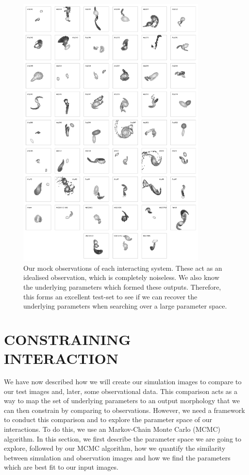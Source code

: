 \begin{figure}
    \centering
    \includegraphics[width=0.85\textwidth]{Chapter1/figures/mock-images.pdf}
    \caption{Our mock observations of each interacting system. These act as an idealised observation, which is completely noiseless. We also know the underlying parameters which formed these outputs. Therefore, this forms an excellent test-set to see if we can recover the underlying parameters when searching over a large parameter space.}
    \label{fig:Obj_Cutout}
\end{figure}

\section{CONSTRAINING INTERACTION}\label{method:constraint}
We have now described how we will create our simulation images to compare to our test images and, later, some observational data. This comparison acts as a way to map the set of underlying parameters to an output morphology that we can then constrain by comparing to observations. However, we need a framework to conduct this comparison and to explore the parameter space of our interactions. To do this, we use an Markov-Chain Monte Carlo (MCMC) algorithm. In this section, we first describe the parameter space we are going to explore, followed by our MCMC algorithm, how we quantify the similarity between simulation and observation images and how we find the parameters which are best fit to our input images.

